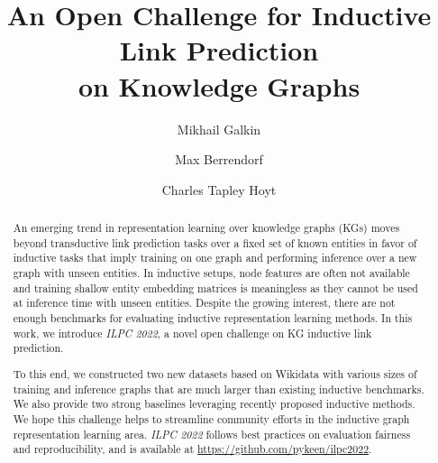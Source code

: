 \documentclass[sigconf,screen]{acmart}
\newcommand{\ilpc}{\textsl{\textsc{ILPC 2022}}\xspace}
\begin{document}
\title[An Open Challenge for Inductive Link Prediction on Knowledge Graphs]{An Open Challenge for Inductive Link Prediction\\on Knowledge Graphs}

\author{Mikhail Galkin}

\author{Max Berrendorf}

\author{Charles Tapley Hoyt}

\newcommand{\mycomment}[3]{\textcolor{#1}{[\bf #2: #3]}}
\newcommand{\cth}[1]{\mycomment{orange}{Charlie}{#1}}
\newcommand{\mg}[1]{\mycomment{green!70!black}{Michael}{#1}}
\newcommand{\mb}[1]{\mycomment{magenta}{Max}{#1}}

\renewcommand{\shortauthors}{Galkin, Berrendorf, and Hoyt}

\begin{abstract}
  An emerging trend in representation learning over knowledge graphs (KGs) moves beyond transductive link prediction tasks over a fixed set of known entities in favor of inductive tasks that imply training on one graph and performing inference over a new graph with unseen entities.
  In inductive setups, node features are often not available and training shallow entity embedding matrices is meaningless as they cannot be used at inference time with unseen entities. Despite the growing interest, there are not enough benchmarks for evaluating inductive representation learning methods.
  In this work, we introduce \ilpc, a novel open challenge on KG inductive link prediction.
  
  To this end, we constructed two new datasets based on Wikidata with various sizes of training and inference graphs that are much larger than existing inductive benchmarks. We also provide two strong baselines leveraging recently proposed inductive methods.
  We hope this challenge helps to streamline community efforts in the inductive graph representation learning area.
  \ilpc follows best practices on evaluation fairness and reproducibility, and is available at \url{https://github.com/pykeen/ilpc2022}.
\end{abstract}
\end{document}
